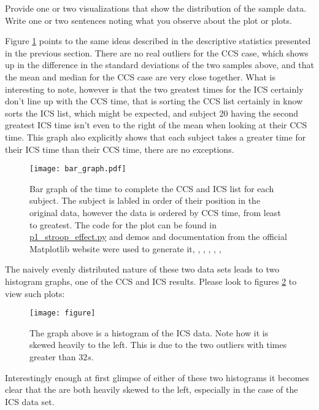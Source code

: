 \documentclass{article}
\begin{document}
{\label{sec:question4}
Provide one or two visualizations that show the distribution of
the sample data.\\
Write one or two sentences noting what you observe about the plot or plots.}

Figure \ref{fig:bar-graph-ccs-vs-ics-times} points to the same ideas described
in the  descriptive statistics presented in the previous section. There are no
real outliers for the CCS case, which shows up in the difference in the standard
deviations of the two samples above, and that the mean and median for the CCS
case are very close together.  What is interesting to note, however is that the
two greatest times for the ICS certainly don't line up with the CCS time, that
is sorting the CCS list certainly in know sorts the ICS list, which might be
expected, and subject 20 having the second greatest ICS time isn't even to the
right of the mean when looking at their CCS time.  This graph also explicitly
shows that each subject takes a greater time for their ICS time than their CCS
time, there are no exceptions.
\label{question4}
\begin{figure}[ht]
  \centering
  \texttt{[image: bar\_graph.pdf]}
  \caption{Bar graph of the time to complete the CCS and ICS list for each
    subject.  The subject is labled in order of their position in the original
    data, however the data is ordered by CCS time, from least to greatest.  The
    code for the plot can be found in
    \href{https://github.com/8leggedunicorn/p1_stroop_effect/blob/master/p1_stroop_effect.py}{p1\_stroop\_effect.py}
    and demos and documentation from the official Matplotlib website were used
    to generate it, 
    \cite{Matplotlib-bar}, 
    \cite{Matplotlib-colors},
    \cite{Matplotlib-legend-transparent}, 
    \cite{Matplotlib-pdf},
    \cite{Matplotlib-pyplot}, 
    \cite{Python-comprehension}}
  \label{fig:bar-graph-ccs-vs-ics-times}
\end{figure}
The naively evenly distributed nature of these two data sets leads to two histogram
graphs, one of the CCS and ICS results.  Please look to figures 
\ref{fig:ICS-histogram} to view such plots:
\begin{figure}[ht]
  \centering
  \texttt{[image: figure]}
  \caption{The graph above is a histogram of the ICS data.  Note how it is
  skewed heavily to the left.  This is due to the two outliers with times
  greater than $32s$.}
  \label{fig:ICS-histogram}
\end{figure}
Interestingly enough at first glimpse of either of these two histograms it
becomes clear that the are both heavily skewed to the left, especially in the
case of the ICS data set.
\end{document}
